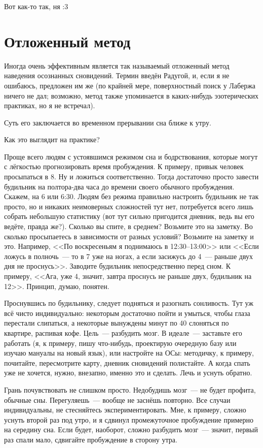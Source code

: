 \documentclass[a4paper,14pt,oneside]{memoir}
\begin{document}
Вот как-то так, ня :3



\chapter{Отложенный метод}

Иногда очень эффективным является так называемый отложенный метод наведения осознанных сновидений. Термин введён Радугой, и, если я не ошибаюсь, предложен им же (по крайней мере, поверхностный поиск у Лабержа ничего не дал; возможно, метод также упоминается в каких-нибудь эзотерических практиках, но я не встречал).

Суть его заключается во временном прерывании сна ближе к утру.

Как это выглядит на практике?

Проще всего людям с устоявшимся режимом сна и бодрствования, которые могут с лёгкостью прогнозировать время пробуждения. К примеру, привык человек просыпаться в 8. Ну и ложиться соответственно. Тогда достаточно просто завести будильник на полтора-два часа до времени своего обычного пробуждения. Скажем, на 6 или 6:30.
Людям без режима правильно настроить будильник не так просто, но и никаких неимоверных сложностей тут нет, потребуется всего лишь собрать небольшую статистику (вот тут сильно пригодится дневник, ведь вы его ведёте, правда же?). Сколько вы спите, в среднем? Возьмите это на заметку. Во сколько просыпаетесь в зависимости от разных условий? Возьмите на заметку и это. Например, <<По воскресеньям я поднимаюсь в 12:30--13:00>> или <<Если ложусь в полночь~--- то в 7 уже на ногах, а если засижусь до 4~--- раньше двух дня не проснусь>>. Заводите будильник непосредственно перед сном. К примеру, <<Ага, уже 4, значит, завтра проснусь не раньше двух, будильник на 12>>. Принцип, думаю, понятен.

Проснувшись по будильнику, следует подняться и разогнать сонливость. Тут уж всё чисто индивидуально: некоторым достаточно пойти и умыться, чтобы глаза перестали слипаться, а некоторые вынуждены минут по 40 слоняться по квартире, распивая кофе. Цель~--- разбудить мозг. В идеале~--- заставьте его работать (я, к примеру, пишу что-нибудь, проектирую очередную базу или изучаю мануалы на новый язык), или настройте на ОСы: методичку, к примеру, почитайте, пересмотрите карту, дневник сновидений полистайте. А когда спать уже не хочется, нужно, внезапно, именно это и сделать. Лечь и уснуть обратно.

Грань почувствовать не слишком просто. Недобудишь мозг~--- не будет профита, обычные сны. Перегуляешь~--- вообще не заснёшь повторно. Все случаи индивидуальны, не стесняйтесь экспериментировать. Мне, к примеру, сложно уснуть второй раз под утро, и я сдвинул промежуточное пробуждение примерно на середину сна. Если будет, наоборот, сложно разбудить мозг~--- значит, первый раз спали мало, сдвигайте пробуждение в сторону утра.
\end{document}
